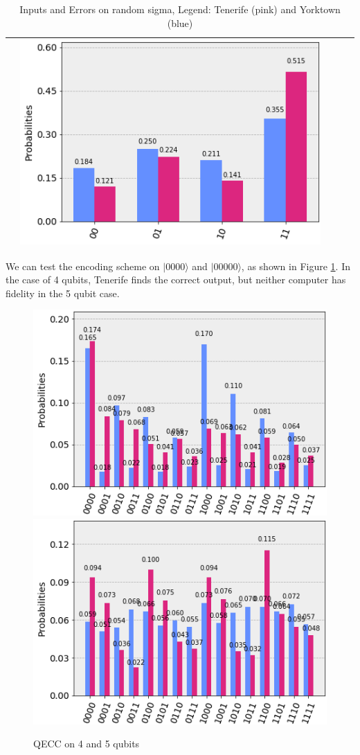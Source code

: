 \documentclass[11pt]{article}
\def\ket#1{| #1 \rangle}
\begin{document}
\begin{table}[h!]
\begin{tabular}{| c | c | c | c | c | }
\begin{minipage}{.215\textwidth}
    \end{minipage}
    &\begin{minipage}{.215\textwidth}
    \includegraphics[width=\linewidth]{img/rand_qecc3_I11.png}
    \end{minipage}
    \\ \hline
\end{tabular}
\caption{Inputs and Errors on random sigma, Legend: Tenerife (pink) and Yorktown (blue)}\label{tbl:sigR}
\end{table}

We can test the encoding scheme on $\ket{0000}$ and $\ket{00000}$, as shown in Figure \ref{fig:q45}. In the case of 4 qubits, Tenerife finds the correct output, but neither computer has fidelity in the 5 qubit case. 

\begin{figure}[h!]
\centering
\includegraphics[width=.45\textwidth]{img/qecc4_X0000.png}
\includegraphics[width=.45\textwidth]{img/qecc5_X00000.png}
\caption{QECC on 4 and 5 qubits}
\label{fig:q45}
\end{figure}
\end{document}
